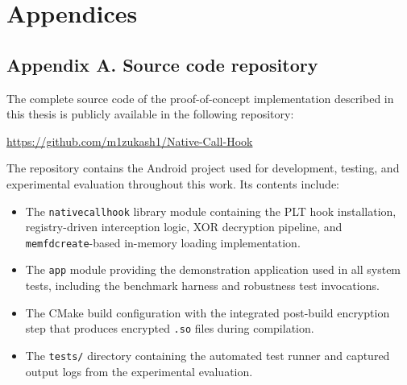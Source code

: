 \documentclass[11pt,a4paper]{report}
\renewcommand\_{{\textunderscore\allowbreak}}
\begin{document}
\newpage
\appendix
\section*{Appendices}

\subsection*{Appendix A. Source code repository}

The complete source code of the proof-of-concept implementation described in this thesis is publicly available in the following repository:

\begin{center}
\url{https://github.com/m1zukash1/Native-Call-Hook}
\end{center}

The repository contains the Android project used for development, testing, and experimental evaluation throughout this work. Its contents include:

\begin{itemize}
    \item The \texttt{nativecallhook} library module containing the PLT hook installation, registry-driven interception logic, XOR decryption pipeline, and \texttt{memfd\_create}-based in-memory loading implementation.
    \item The \texttt{app} module providing the demonstration application used in all system tests, including the benchmark harness and robustness test invocations.
    \item The CMake build configuration with the integrated post-build encryption step that produces encrypted \texttt{.so} files during compilation.
    \item The \texttt{tests/} directory containing the automated test runner and captured output logs from the experimental evaluation.
\end{itemize}
\end{document}
